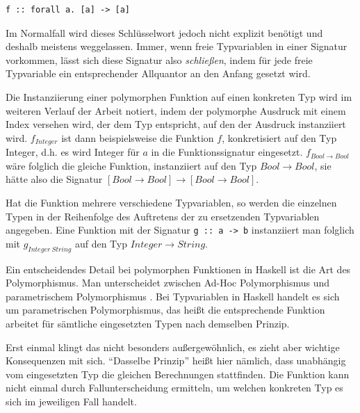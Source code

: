 \begin{verbatim}
f :: forall a. [a] -> [a]
\end{verbatim}

Im Normalfall wird dieses Schlüsselwort jedoch nicht explizit benötigt und deshalb meistens weggelassen. Immer, wenn
freie Typvariablen in einer Signatur vorkommen, lässt sich diese Signatur also \textit{schließen}, indem für jede freie Typvariable
ein entsprechender Allquantor an den Anfang gesetzt wird.

Die Instanziierung einer polymorphen Funktion auf einen konkreten Typ wird im weiteren Verlauf der Arbeit notiert, indem der
polymorphe Ausdruck mit einem Index versehen wird, der dem Typ entspricht, auf den der Ausdruck instanziiert wird.
$f_{Integer}$ ist dann beispielsweise die Funktion $f$, konkretisiert auf den Typ Integer, d.h. es wird Integer
für $a$ in die Funktionssignatur eingesetzt. $f_{Bool \rightarrow Bool}$ wäre folglich die gleiche Funktion, instanziiert auf den Typ
$Bool \rightarrow Bool$, sie hätte also die Signatur $[Bool \rightarrow Bool] \rightarrow [Bool \rightarrow Bool]$.

Hat die Funktion mehrere verschiedene Typvariablen, so werden die einzelnen Typen
in der Reihenfolge des Auftretens der zu ersetzenden Typvariablen angegeben. Eine Funktion mit der Signatur \texttt{g :: a -> b} instanziiert man
folglich mit $g_{Integer\ String}$ auf den Typ $Integer \rightarrow String$.


Ein entscheidendes Detail bei polymorphen Funktionen in Haskell ist die Art des Polymorphismus.
Man unterscheidet zwischen Ad-Hoc Polymorphismus und parametrischem Poly\-mor\-phis\-mus \cite{strachey}. Bei Typvariablen
in Haskell handelt es sich um parametrischen Polymorphismus, das heißt die entsprechende Funktion arbeitet für sämtliche
eingesetzten Typen nach demselben Prinzip.

Erst einmal klingt das nicht besonders außergewöhnlich, es zieht aber wichtige
Konsequenzen mit sich. ``Dasselbe Prinzip'' heißt hier nämlich, dass unabhängig vom eingesetzten Typ die gleichen
Berechnungen stattfinden. Die Funktion kann nicht einmal
durch Fallunterscheidung ermitteln, um welchen konkreten Typ es sich im jeweiligen Fall handelt.

